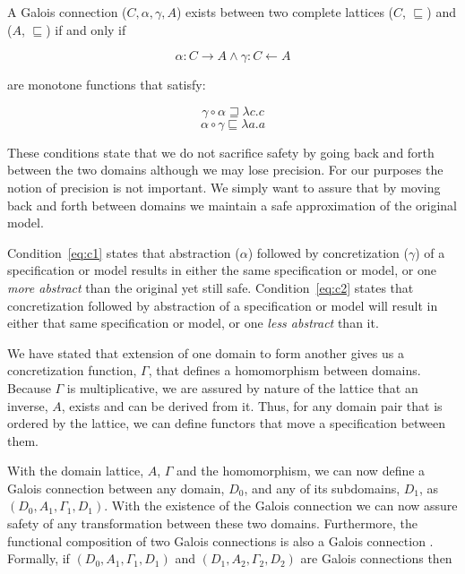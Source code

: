 \documentclass[12pt]{article}
\begin{document}
A Galois connection ($C,\alpha,\gamma,A$) exists between two complete
lattices ($C$, $\sqsubseteq$) and ($A$, $\sqsubseteq$) if and only if

\[\alpha:C \rightarrow A \wedge \gamma:C \leftarrow A\]

\noindent are monotone functions that satisfy:

\begin{equation}
\label{eq:c1}
\gamma \circ \alpha \sqsupseteq \lambda c.c
\end{equation}
\begin{equation}
\label{eq:c2}
\alpha \circ \gamma \sqsubseteq \lambda a.a
\end{equation}

\noindent These conditions state that we do not sacrifice safety by
going back and forth between the two domains although we may lose
precision.  For our purposes the notion of precision is not important.
We simply want to assure that by moving back and forth between domains
we maintain a safe approximation of the original model.

Condition~\ref{eq:c1} states that abstraction ($\alpha$) followed by
concretization ($\gamma$) of a specification or model results in
either the same specification or model, or one \emph{more abstract}
than the original yet still safe.  Condition~\ref{eq:c2} states that
concretization followed by abstraction of a specification or model
will result in either that same specification or model, or one
\emph{less abstract} than it.

We have stated that extension of one domain to form another gives us a
concretization function, $\Gamma$, that defines a homomorphism between
domains.  Because $\Gamma$ is multiplicative, we are assured by nature
of the lattice that an inverse, $A$, exists and can be derived from
it.  Thus, for any domain pair that is ordered by the lattice, we can
define functors that move a specification between them.

With the domain lattice, $A$, $\Gamma$ and the homomorphism, we can
now define a Galois connection between any domain, $D_0$, and any of
its subdomains, $D_1$, as $(D_0,A_1,\Gamma_1,D_1)$.  With the
existence of the Galois connection we can now assure safety of any
transformation between these two domains.  Furthermore, the functional
composition of two Galois connections is also a Galois connection
\cite{Nielson:05:Principles-of-P}. Formally, if $(D_0, A_1, \Gamma_1,
D_1)$ and $(D_1, A_2, \Gamma_2,D_2)$ are Galois connections then
\end{document}
